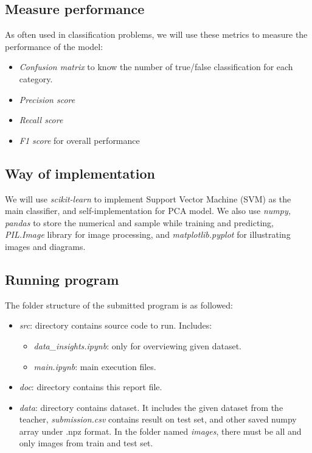 \documentclass[12pt, a4paper]{article}
\begin{document}
	\subsection{Measure performance}
	
	As often used in classification problems, we will use these metrics to measure the performance of the model:
	
	\begin{itemize}
		\item \emph{Confusion matrix} to know the number of true/false classification for each category.
		\item \emph{Precision score}
		\item \emph{Recall score}
		\item \emph{F1 score} for overall performance
	\end{itemize}
	
	\subsection{Way of implementation}
	
	We will use \emph{scikit-learn} to implement Support Vector Machine (SVM) as the main classifier, and self-implementation for PCA model. We also use \emph{numpy, pandas} to store the numerical and sample while training and predicting, \emph{PIL.Image} library for image processing, and \emph{matplotlib.pyplot} for illustrating images and diagrams.
	
	\subsection{Running program}
	
	The folder structure of the submitted program is as followed:
	
	\begin{itemize}
		\item \emph{src}: directory contains source code to run. Includes:
			\begin{itemize}
				\item \emph{data\_insights.ipynb}: only for overviewing given dataset.
				\item \emph{main.ipynb}: main execution files.
			\end{itemize}
		\item \emph{doc}: directory contains this report file.
		\item \emph{data}: directory contains dataset. It includes the given dataset from the teacher, \emph{submission.csv} contains result on test set, and other saved numpy array under .npz format. In the folder named \emph{images}, there must be all and only images from train and test set.
	\end{itemize}
	
\end{document}
